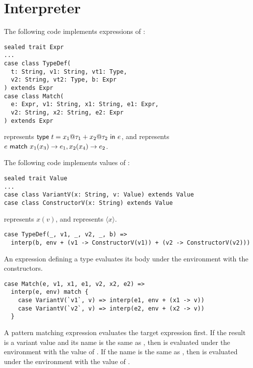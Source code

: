 \section{Interpreter}

The following code implements expressions of \Lang:

\begin{verbatim}
sealed trait Expr
...
case class TypeDef(
  t: String, v1: String, vt1: Type,
  v2: String, vt2: Type, b: Expr
) extends Expr
case class Match(
  e: Expr, v1: String, x1: String, e1: Expr,
  v2: String, x2: String, e2: Expr
) extends Expr
\end{verbatim}

 represents
$\textsf{type}\ t=x_1@\tau_1+x_2@\tau_2\ \textsf{in}\ e$, and
 represents
$e\ \textsf{match}\ x_1(x_3)\rightarrow e_1,x_2(x_4)\rightarrow e_2$.

The following code implements values of \Lang:

\begin{verbatim}
sealed trait Value
...
case class VariantV(x: String, v: Value) extends Value
case class ConstructorV(x: String) extends Value
\end{verbatim}

 represents $x(v)$, and
 represents $\langle x\rangle$.

\begin{verbatim}
case TypeDef(_, v1, _, v2, _, b) =>
  interp(b, env + (v1 -> ConstructorV(v1)) + (v2 -> ConstructorV(v2)))
\end{verbatim}

An expression defining a type evaluates its body under the
environment with the constructors.

\begin{verbatim}
case Match(e, v1, x1, e1, v2, x2, e2) =>
  interp(e, env) match {
    case VariantV(`v1`, v) => interp(e1, env + (x1 -> v))
    case VariantV(`v2`, v) => interp(e2, env + (x2 -> v))
  }
\end{verbatim}

A pattern matching expression evaluates the target expression first.
If the result is a variant value and its name is the same as ,
then  is evaluated under the environment with the value of
. If the name is the same as , then  is
evaluated under the environment with the value of .

